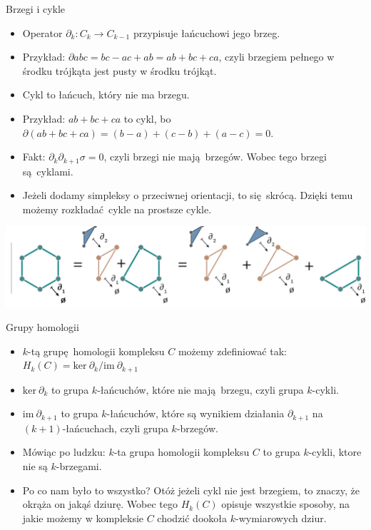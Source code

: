 \documentclass{beamer}
\begin{document}
\begin{frame}{Brzegi i cykle}

\begin{itemize}
	\item Operator $\partial_k : C_k \to C_{k - 1}$ przypisuje łańcuchowi jego brzeg.
	\item Przykład: $\partial abc = bc - ac + ab = ab + bc + ca$, czyli brzegiem pełnego w środku trójkąta jest pusty w środku trójkąt.
	\item Cykl to łańcuch, który nie ma brzegu.
	\item Przykład: $ab + bc + ca$ to cykl, bo $\partial (ab + bc + ca) = (b - a) + (c - b) + (a - c) = 0$.
	\item Fakt: $\partial_k \partial_{k + 1} \sigma = 0$, czyli brzegi nie mają brzegów. Wobec tego brzegi są cyklami.
	\item Jeżeli dodamy simpleksy o przeciwnej orientacji, to się skrócą. Dzięki temu możemy rozkładać cykle na prostsze cykle.
\end{itemize}

\begin{center}
	\includegraphics{Cykle.png}
\end{center}

\end{frame}

\begin{frame}{Grupy homologii}
\begin{itemize}
	\item $k$-tą grupę homologii kompleksu $C$ możemy zdefiniować tak: $H_k(C) = \text{ker}\ \partial_k / \text{im}\ \partial_{k + 1}$
	\item $\text{ker}\ \partial_k$ to grupa $k$-łańcuchów, które nie mają brzegu, czyli grupa $k$-cykli.
	\item $\text{im}\ \partial_{k + 1}$ to grupa $k$-łańcuchów, które są wynikiem działania $\partial_{k + 1}$ na $(k + 1)$-łańcuchach, czyli grupa $k$-brzegów.
	\item Mówiąc po ludzku: $k$-ta grupa homologii kompleksu $C$ to grupa $k$-cykli, ktore nie są $k$-brzegami.
	\item Po co nam było to wszystko? Otóż jeżeli cykl nie jest brzegiem, to znaczy, że okrąża on jakąś dziurę. Wobec tego $H_k(C)$ opisuje wszystkie sposoby, na jakie możemy w kompleksie $C$ chodzić dookoła $k$-wymiarowych dziur.
\end{itemize}
\end{frame}
\end{document}

